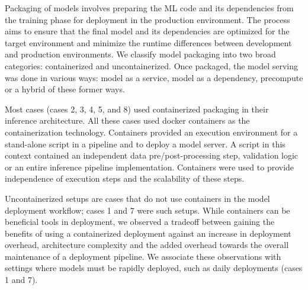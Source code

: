 
Packaging of models involves preparing the ML code and its dependencies from the training phase for deployment in the production environment. The process aims to ensure that the final model and its dependencies are optimized for the target environment and minimize the runtime differences between development and production environments. We classify model packaging into two broad categories: containerized and uncontainerized. Once packaged, the model serving was done in various ways: model as a service, model as a dependency, precompute or a hybrid of these former ways. 

Most cases (cases 2, 3, 4, 5, and 8) used containerized packaging in their inference architecture. All these cases used docker containers as the containerization technology. Containers provided an execution environment for a stand-alone script in a pipeline and to deploy a model server. A script in this context contained an independent data pre/post-processing step, validation logic or an entire inference pipeline implementation. Containers were used to provide independence of execution steps and the scalability of these steps.

Uncontainerized setups are cases that do not use containers in the model deployment workflow; cases 1 and 7 were such setups. While containers can be beneficial tools in deployment, we observed a tradeoff between gaining the benefits of using a containerized deployment against an increase in deployment overhead, architecture complexity and the added overhead towards the overall maintenance of a deployment pipeline. We associate these observations with settings where models must be rapidly deployed, such as daily deployments (cases 1 and 7). %

